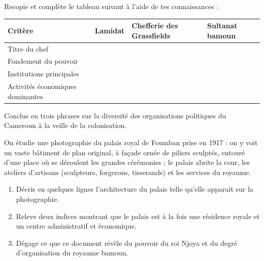 \documentclass[11pt]{article}
\newcounter{popsec}
\newcounter{popsub}
\newcommand{\courssub}[1]{%
  \stepcounter{popsub}%
  \par\vspace{9pt}\noindent{\popxbold\fontsize{11.5}{13}\selectfont\color{popink}{\color{poporange}\thepopsec.\thepopsub}\hspace{6pt}#1}\par\nopagebreak\vspace{4pt}
}
\begin{document}
\begin{exercice}
Recopie et complète le tableau suivant à l'aide de tes connaissances :

\begin{center}
\begin{tabularx}{\linewidth}{|l|X|X|X|}
\hline
\rowcolor{popblueL} \textbf{Critère} & \textbf{Lamidat} & \textbf{Chefferie des Grassfields} & \textbf{Sultanat bamoun} \\
\hline
Titre du chef & & & \\
\hline
Fondement du pouvoir & & & \\
\hline
Institutions principales & & & \\
\hline
Activités économiques dominantes & & & \\
\hline
\end{tabularx}
\end{center}

Conclus en trois phrases sur la diversité des organisations politiques du Cameroun à la veille de la colonisation.
\end{exercice}

\begin{exercice}
On étudie une photographie du palais royal de Foumban prise en 1917 : on y voit un vaste bâtiment de plan original, à façade ornée de piliers sculptés, entouré d'une place où se déroulent les grandes cérémonies ; le palais abrite la cour, les ateliers d'artisans (sculpteurs, forgerons, tisserands) et les services du royaume.
\begin{enumerate}
\item Décris en quelques lignes l'architecture du palais telle qu'elle apparaît sur la photographie.
\item Releve deux indices montrant que le palais est à la fois une résidence royale et un centre administratif et économique.
\item Dégage ce que ce document révèle du pouvoir du roi Njoya et du degré d'organisation du royaume bamoun.
\end{enumerate}
\end{exercice}

\courssub{Je me prépare au Bac}
\end{document}

